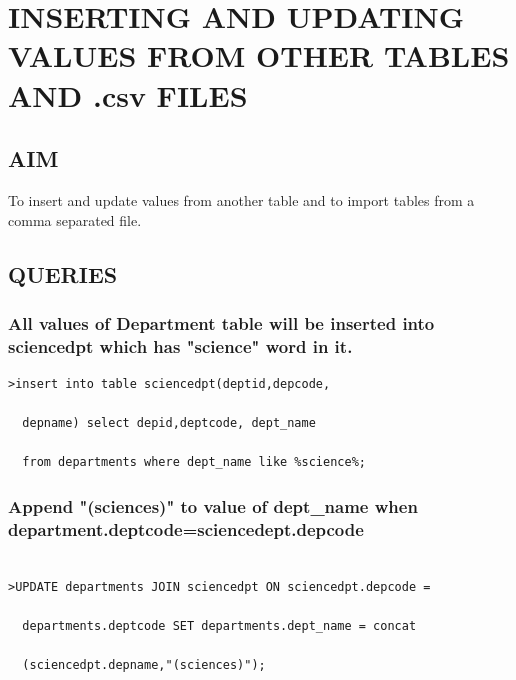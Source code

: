 \documentclass{article}
\begin{document}
\section{INSERTING AND UPDATING VALUES FROM OTHER TABLES AND .csv FILES}
\hrulefill
\vspace{1cm}
\begin{flushleft}
\subsection{AIM}
To insert and update values from another table and to import tables from a comma separated file.
\subsection{QUERIES}
\subsubsection{All values of Department table will be inserted into sciencedpt which has "science" word in it.}

\begin{verbatim}
>insert into table sciencedpt(deptid,depcode,

  depname) select depid,deptcode, dept_name

  from departments where dept_name like %science%;
\end{verbatim}
\subsubsection{Append "(sciences)" to value of dept\_name when department.deptcode=sciencedept.depcode}

\begin{verbatim}

>UPDATE departments JOIN sciencedpt ON sciencedpt.depcode =

  departments.deptcode SET departments.dept_name = concat
 
  (sciencedpt.depname,"(sciences)");
\end{verbatim}
\end{flushleft}
\newpage
{}
\end{document}
